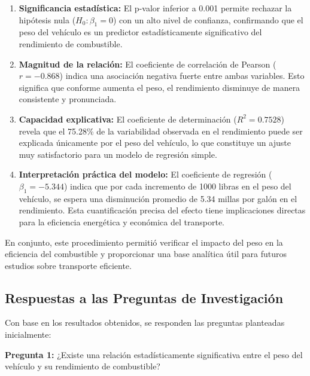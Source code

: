 \documentclass[12pt, letterpaper]{article}
\begin{document}
    \begin{enumerate}
        \item \textbf{Significancia estadística:} El p-valor inferior a 0.001 permite
            rechazar la hipótesis nula ($H_0: \beta_1 = 0$) con un alto nivel de
            confianza, confirmando que el peso del vehículo es un predictor estadísticamente
            significativo del rendimiento de combustible.

        \item \textbf{Magnitud de la relación:} El coeficiente de correlación de
            Pearson ($r = -0.868$) indica una asociación negativa fuerte entre ambas
            variables. Esto significa que conforme aumenta el peso, el rendimiento
            disminuye de manera consistente y pronunciada.

        \item \textbf{Capacidad explicativa:} El coeficiente de determinación
            ($R^{2} = 0.7528$) revela que el 75.28\% de la variabilidad observada en
            el rendimiento puede ser explicada únicamente por el peso del vehículo,
            lo que constituye un ajuste muy satisfactorio para un modelo de regresión
            simple.

        \item \textbf{Interpretación práctica del modelo:} El coeficiente de regresión
            ($\beta_1 = -5.344$) indica que por cada incremento de 1000 libras en el
            peso del vehículo, se espera una disminución promedio de 5.34 millas por
            galón en el rendimiento. Esta cuantificación precisa del efecto tiene
            implicaciones directas para la eficiencia energética y económica del
            transporte.
    \end{enumerate}

    En conjunto, este procedimiento permitió verificar el impacto del peso en la eficiencia del combustible y proporcionar una base analítica útil para  futuros estudios sobre transporte eficiente.

    \subsection{Respuestas a las Preguntas de Investigación}

    Con base en los resultados obtenidos, se responden las preguntas planteadas
    inicialmente:

    \textbf{Pregunta 1:} ¿Existe una relación estadísticamente significativa entre
    el peso del vehículo y su rendimiento de combustible?
\end{document}
